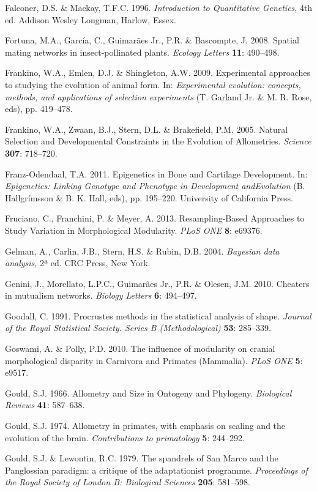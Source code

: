 \documentclass[12pt,twoside]{report}
\begin{document}
Falconer, D.S. \& Mackay, T.F.C. 1996. \emph{Introduction to
Quantitative Genetics}, 4th ed. Addison Wesley Longman, Harlow, Essex.

Fortuna, M.A., García, C., Guimarães Jr., P.R. \& Bascompte, J. 2008.
Spatial mating networks in insect-pollinated plants. \emph{Ecology
Letters} \textbf{11}: 490--498.

Frankino, W.A., Emlen, D.J. \& Shingleton, A.W. 2009. Experimental
approaches to studying the evolution of animal form. In:
\emph{Experimental evolution: concepts, methods, and applications of
selection experiments} (T. Garland Jr. \& M. R. Rose, eds), pp.
419--478.

Frankino, W.A., Zwaan, B.J., Stern, D.L. \& Brakefield, P.M. 2005.
Natural Selection and Developmental Constraints in the Evolution of
Allometries. \emph{Science} \textbf{307}: 718--720.

Franz-Odendaal, T.A. 2011. Epigenetics in Bone and Cartilage
Development. In: \emph{Epigenetics: Linking Genotype and Phenotype in
Development andEvolution} (B. Hallgrímsson \& B. K. Hall, eds), pp.
195--220. University of California Press.

Fruciano, C., Franchini, P. \& Meyer, A. 2013. Resampling-Based
Approaches to Study Variation in Morphological Modularity. \emph{PLoS
ONE} \textbf{8}: e69376.

Gelman, A., Carlin, J.B., Stern, H.S. \& Rubin, D.B. 2004.
\emph{Bayesian data analysis}, 2ª ed. CRC Press, New York.

Genini, J., Morellato, L.P.C., Guimarães Jr., P.R. \& Olesen, J.M. 2010.
Cheaters in mutualism networks. \emph{Biology Letters} \textbf{6}:
494--497.

Goodall, C. 1991. Procrustes methods in the statistical analysis of
shape. \emph{Journal of the Royal Statistical Society. Series B
(Methodological)} \textbf{53}: 285--339.

Goswami, A. \& Polly, P.D. 2010. The influence of modularity on cranial
morphological disparity in Carnivora and Primates (Mammalia). \emph{PLoS
ONE} \textbf{5}: e9517.

Gould, S.J. 1966. Allometry and Size in Ontogeny and Phylogeny.
\emph{Biological Reviews} \textbf{41}: 587--638.

Gould, S.J. 1974. Allometry in primates, with emphasis on scaling and
the evolution of the brain. \emph{Contributions to primatology}
\textbf{5}: 244--292.

Gould, S.J. \& Lewontin, R.C. 1979. The spandrels of San Marco and the
Panglossian paradigm: a critique of the adaptationist programme.
\emph{Proceedings of the Royal Society of London B: Biological Sciences}
\textbf{205}: 581--598.
\end{document}
